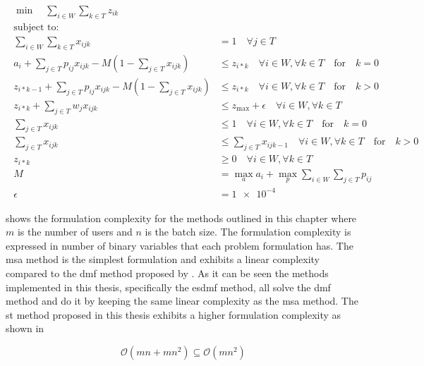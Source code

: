 \begin{align}
	\begin{split}
	    \min \quad \sum_{i \in W} \sum_{k \in T} z_{ik}\\
	    \text{subject to:} \\
	    \sum_{i \in W} \sum_{k \in T} x_{ijk} &= 1 \quad \forall j \in T\\
	    a_i + \sum_{j \in T} p_{ij} x_{ijk} - M(1 - \sum_{j \in T} x_{ijk}) &\leq z_{i*k} \quad \forall i \in W, \forall k \in T \quad \text{for} \quad k=0\\
	    z_{i*k-1} + \sum_{j \in T} p_{ij} x_{ijk} - M(1 - \sum_{j \in T} x_{ijk}) &\leq z_{i*k} \quad \forall i \in W, \forall k \in T \quad \text{for} \quad k>0\\
	    z_{i*k}+ \sum_{j \in T} w_j x_{ijk} &\leq z_{\text{max}} + \epsilon \quad \forall i \in W, \forall k \in T\\
	    \sum_{j \in T} x_{ijk} &\leq 1 \quad \forall i \in W, \forall k \in T \quad \text{for} \quad k=0\\
	    \sum_{j \in T} x_{ijk} &\leq \sum_{j \in T} x_{ijk-1} \quad \forall i \in W, \forall k \in T \quad \text{for} \quad k>0\\
	    z_{i*k} &\geq 0 \quad \forall i \in W, \forall k \in T\\
	    M &= \max_a a_i + \max_p \sum_{i \in W} \sum_{j \in T} p_{ij}\\
	    \epsilon &= \num{1e-4}
	\end{split}
\end{align}

 shows the formulation complexity for the methods outlined in this chapter where $m$ is the number of users and $n$ is the batch size. The formulation complexity is expressed in number of binary variables that each problem formulation has. The \gls{msa} method is the simplest formulation and exhibits a linear complexity compared to the \gls{dmf} method proposed by \citet{Zeng2005}. As it can be seen the methods implemented in this thesis, specifically the \gls{esdmf} method, all solve the \gls{dmf} method and do it by keeping the same linear complexity as the \gls{msa} method. The \gls{st} method proposed in this thesis exhibits a higher formulation complexity as shown in 

\begin{equation}
\label{eq:st_complexity}
	\mathcal{O}(mn+mn^2) \subseteq \mathcal{O}(mn^2)
\end{equation}
 
